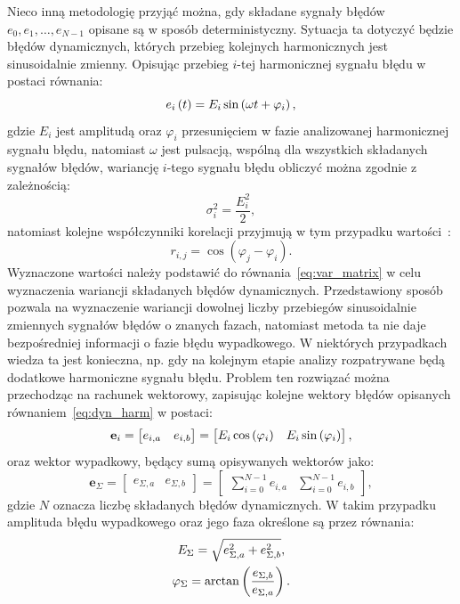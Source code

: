 Nieco inną metodologię przyjąć można, gdy składane sygnały błędów $e_{0}, e_{1}, \hdots, e_{N-1}$ opisane są w sposób deterministyczny. Sytuacja ta dotyczyć będzie błędów dynamicznych, których przebieg kolejnych harmonicznych jest sinusoidalnie zmienny. Opisując przebieg $i$-tej harmonicznej sygnału błędu w postaci równania:
\begin{equation}
e_{i} \left(t\right) = E_{i} \sin \left( \omega t + \varphi_{i} \right) \label{eq:dyn_harm},
\end{equation}
gdzie $E_{i}$ jest amplitudą oraz $\varphi_{i}$ przesunięciem w fazie analizowanej harmonicznej sygnału błędu, natomiast $\omega$ jest pulsacją, wspólną dla wszystkich składanych sygnałów błędów, wariancję $i$-tego sygnału błędu obliczyć można zgodnie z zależnością:
\begin{equation}
\sigma_{i}^{2} = \frac{E_{i}^{2}}{2} \label{eq:dyn_var},
\end{equation}
natomiast kolejne współczynniki korelacji przyjmują w tym przypadku wartości~\cite{jakubiec_system}:
\begin{equation}
r_{i,j} = \cos \left( \varphi_{j} - \varphi_{i} \right) \label{eq:dyn_corr}.
\end{equation}
Wyznaczone wartości należy podstawić do równania~\eqref{eq:var_matrix} w celu wyznaczenia wariancji składanych błędów dynamicznych. Przedstawiony sposób pozwala na wyznaczenie wariancji dowolnej liczby przebiegów sinusoidalnie zmiennych sygnałów błędów o znanych fazach, natomiast metoda ta nie daje bezpośredniej informacji o fazie błędu wypadkowego. W niektórych przypadkach wiedza ta jest konieczna, np. gdy na kolejnym etapie analizy rozpatrywane będą dodatkowe harmoniczne sygnału błędu. Problem ten rozwiązać można przechodząc na rachunek wektorowy, zapisując kolejne wektory błędów opisanych równaniem~\eqref{eq:dyn_harm} w postaci:
\begin{equation}
\mathbf{e}_{i} =
\begin{bmatrix}
e_{i,a} & e_{i,b}
\end{bmatrix}
=
\begin{bmatrix}
E_{i} \cos \left(\varphi_{i}\right) & E_{i} \sin \left(\varphi_{i}\right)
\end{bmatrix}
\label{eq:dyn_vect},
\end{equation}
oraz wektor wypadkowy, będący sumą opisywanych wektorów jako:
\begin{equation}
\mathbf{e}_{\Sigma} =
\begin{bmatrix}
e_{\Sigma,a} & e_{\Sigma,b}
\end{bmatrix}
=
\begin{bmatrix}
\sum _{i = 0} ^{N-1} e_{i,a} & \sum _{i = 0} ^{N-1} e_{i,b}
\end{bmatrix}
\label{eq:dyn_vect_sum},
\end{equation}
gdzie $N$ oznacza liczbę składanych błędów dynamicznych. W takim przypadku amplituda błędu wypadkowego oraz jego faza określone są przez równania:
\begin{gather}
E_{\Sigma} = \sqrt{e_{\Sigma,a}^{2} + e_{\Sigma,b}^{2}} \label{eq:dyn_vect_amp}, \\
\varphi_{\Sigma} = \arctan \left(\frac{e_{\Sigma,b}}{e_{\Sigma,a}}\right) \label{eq:dyn_vect_phi}.
\end{gather}

